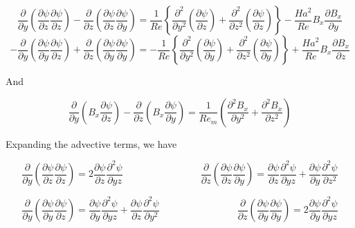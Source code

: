 \documentclass[11pt]{article}
\begin{document}
\begin{equation}
	\frac{\partial}{\partial y}
	\left(
	\frac{\partial \psi}{\partial z}
	\frac{\partial \psi}{\partial z}
	\right)
	-
	\frac{\partial}{\partial z}
	\left(
	\frac{\partial \psi}{\partial z}
	\frac{\partial \psi}{\partial y}
	\right)
	=
	\frac{1}{Re}
	\left\{
	\frac{\partial^2}{\partial y^2}
	\left(
	\frac{\partial \psi}{\partial z}
	\right)
	+
	\frac{\partial^2}{\partial z^2}
	\left(
	\frac{\partial \psi}{\partial z}
	\right)
	\right\}
	-
	\frac{Ha^2}{Re}
	B_x
	\frac{\partial B_x}{\partial y}
\end{equation}
\begin{equation}
	-\frac{\partial}{\partial y}
	\left(
	\frac{\partial \psi}{\partial y}
	\frac{\partial \psi}{\partial z}
	\right)
	+ \frac{\partial}{\partial z}
	\left(
	\frac{\partial \psi}{\partial y}
	\frac{\partial \psi}{\partial y}
	\right)
	=
	- \frac{1}{Re}
	\left\{
	\frac{\partial^2}{\partial y^2}
	\left(
	\frac{\partial \psi}{\partial y}
	\right)
	+\frac{\partial^2}{\partial z^2}
	\left(
	\frac{\partial \psi}{\partial y}
	\right)
	\right\}
	+ \frac{Ha^2}{Re}
	B_x
	\frac{\partial B_x}{\partial z}
\end{equation}

And

\begin{equation}
	\frac{\partial}{\partial y} \left( B_x \frac{\partial \psi}{\partial z} \right)
	- \frac{\partial}{\partial z} \left( B_x \frac{\partial \psi}{\partial y} \right)
	=
	\frac{1}{Re_m}
	\left(
	\frac{\partial^2 B_x}{\partial y^2}
	+ \frac{\partial^2 B_x}{\partial z^2}
	\right)
\end{equation}

Expanding the advective terms, we have

\begin{equation}
	\frac{\partial}{\partial y}
	\left(
	\frac{\partial \psi}{\partial z}
	\frac{\partial \psi}{\partial z}
	\right)
	=
	2
	\frac{\partial \psi }{\partial z}
	\frac{\partial^2 \psi}{\partial yz}
	\qquad \qquad
	\qquad \qquad
	\frac{\partial}{\partial z}
	\left(
	\frac{\partial \psi}{\partial z}
	\frac{\partial \psi}{\partial y}
	\right)
	=
	\frac{\partial \psi}{\partial z}
	\frac{\partial^2 \psi}{\partial yz} +
	\frac{\partial \psi}{\partial y}
	\frac{\partial^2 \psi}{\partial z^2}
\end{equation}

\begin{equation}
	\frac{\partial}{\partial y}
	\left(
	\frac{\partial \psi}{\partial y}
	\frac{\partial \psi}{\partial z}
	\right)
	=
	\frac{\partial \psi}{\partial y}
	\frac{\partial^2 \psi}{\partial yz} +
	\frac{\partial \psi}{\partial z}
	\frac{\partial^2 \psi}{\partial y^2}
	\qquad \qquad
	\qquad \qquad
	\frac{\partial}{\partial z}
	\left(
	\frac{\partial \psi}{\partial y}
	\frac{\partial \psi}{\partial y}
	\right)
	=
	2
	\frac{\partial \psi }{\partial y}
	\frac{\partial^2 \psi}{\partial yz}
\end{equation}
\end{document}
